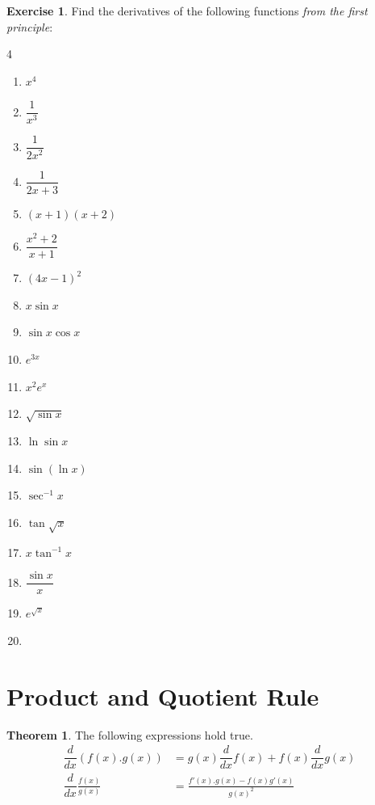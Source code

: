 \documentclass[../../main.tex]{subfiles}
\theoremstyle{definition}
\newtheorem{theorem}{Theorem}[section]
\newtheorem{exercise}{Exercise}[section]
\begin{document}
\begin{exercise}
Find the derivatives of the following functions \textit{from the first principle}:
\begin{multicols}{4}
\begin{enumerate}
    \item $x^4$
    \item $\dfrac{1}{x^3}$
    \item $\dfrac{1}{2x^2}$
    \item $\dfrac{1}{2x+3}$
    \item $(x+1)(x+2)$
    \item $\dfrac{x^2+2}{x+1}$
    \item $(4x-1)^2$
    \item $x\sin x$
    \item $\sin x\cos x$
    \item $e^{3x}$
    \item $x^2e^x$
    \item $\sqrt{\sin x}$
    \item $\ln{\sin x}$
    \item $\sin(\ln x)$
    \item $\sec^{-1} x$
    \item $\tan \sqrt{x}$
    \item $x \tan^{-1}x$
    \item $\dfrac{\sin x}{x}$
    \item $e^{\sqrt{x}}$
    \item[] \phantom{x}
\end{enumerate}
\end{multicols}    
\end{exercise}



\section{Product and Quotient Rule}

\begin{theorem}
The following expressions hold true.
\begin{align*}
   \dfrac{d}{dx}(f(x).g(x)) &=  g(x)\dfrac{d}{dx}f(x)+f(x)\dfrac{d}{dx}g(x) \\
   \dfrac{d}{dx}\frac{f(x)}{g(x)} &= \frac{f'(x).g(x)-f(x)g'(x)}{g(x)^2}
\end{align*}
\end{theorem}
\end{document}
